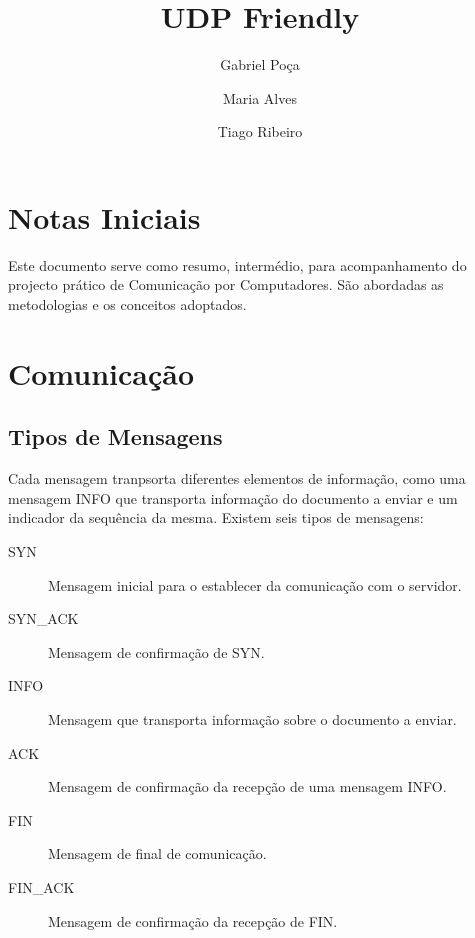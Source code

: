 \documentclass{llncs}
\begin{document}
\mainmatter
\title{UDP Friendly}


\author{Gabriel Poça \and Maria Alves \and Tiago Ribeiro}



\date{}


\maketitle

\section{Notas Iniciais}
Este documento serve como resumo, intermédio, para acompanhamento do projecto prático de Comunicação por Computadores. São abordadas as metodologias e os conceitos adoptados.

\section{Comunicação}
\subsection{Tipos de Mensagens}
Cada mensagem tranpsorta diferentes elementos de informação, como uma mensagem INFO que transporta informação do documento a enviar e um indicador da sequência da mesma. Existem seis tipos de mensagens:
\begin{description}
	\item[SYN] Mensagem inicial para o establecer da comunicação com o servidor.
	\item[SYN\_ACK] Mensagem de confirmação de SYN.
	\item[INFO] Mensagem que transporta informação sobre o documento a enviar.
	\item[ACK] Mensagem de confirmação da recepção de uma mensagem INFO.
	\item[FIN] Mensagem de final de comunicação.
	\item[FIN\_ACK] Mensagem de confirmação da recepção de FIN.
\end{description}
\end{document}
